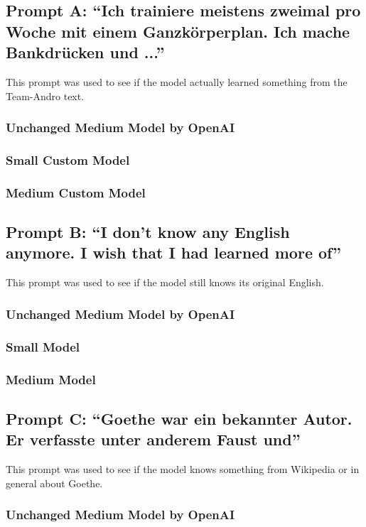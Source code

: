 \documentclass{scrartcl}
\begin{document}
\subsection*{Prompt A: \enquote{Ich trainiere meistens zweimal pro Woche mit einem Ganzkörperplan. Ich mache Bankdrücken und ...}}
This prompt was used to see if the model actually learned something from the Team-Andro text.

\subsubsection*{Unchanged Medium Model by OpenAI}
\subsubsection*{Small Custom Model}
\subsubsection*{Medium Custom Model}



\subsection*{Prompt B: \enquote{I don't know any English anymore. I wish that I had learned more of}}
This prompt was used to see if the model still knows its original English.

\subsubsection*{Unchanged Medium Model by OpenAI}
\subsubsection*{Small Model}
\subsubsection*{Medium Model}

\subsection*{Prompt C: \enquote{Goethe war ein bekannter Autor. Er verfasste unter anderem Faust und}}
This prompt was used to see if the model knows something from Wikipedia or in general about Goethe.

\subsubsection*{Unchanged Medium Model by OpenAI}
\end{document}
